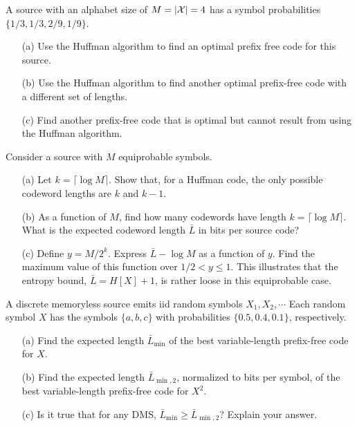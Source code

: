 \documentclass{assignment}
\begin{document}
\begin{prob}[2.12]
    A source with an alphabet size of $M=\left\lvert\mathcal{X}\right\rvert=4$ has a symbol probabilities $\{1/3,1/3,2/9,1/9\}$.
    \begin{itemize}
        \item[(a)] Use the Huffman algorithm to find an optimal prefix free code for this source.
        \item[(b)] Use the Huffman algorithm to find another optimal prefix-free code with a different set of lengths.
        \item[(c)] Find another prefix-free code that is optimal but cannot result from using the Huffman algorithm.
    \end{itemize}
\end{prob}
\begin{sol}
\end{sol}

\begin{prob}[2.14]
    Consider a source with $M$ equiprobable symbols.
    \begin{itemize}
        \item[(a)] Let $k=\lceil\log M\rceil$. Show that, for a Huffman code, the only possible codeword lengths are $k$ and $k-1$.
        \item[(b)] As a function of $M$, find how many codewords have length $k=\lceil\log M\rceil$. What is the expected codeword length $\bar{L}$ in bits per source code?
        \item[(c)] Define $y=M/2^k$. Express $\bar{L}-\log M$ as a function of $y$. Find the maximum value of this function over $1/2<y\leq 1$. This illustrates that the entropy bound, $\bar{L}=H[X]+1$, is rather loose in this equiprobable case.
    \end{itemize}
\end{prob}
\begin{sol}
\end{sol}

\begin{prob}[2.21]
    A discrete memoryless source emits iid random symbols $X_1,X_2,\cdots$ Each random symbol $X$ has the symbols $\{a,b,c\}$ with probabilities $\{0.5,0.4,0.1\}$, respectively.
    \begin{itemize}
        \item[(a)] Find the expected length $\bar{L}_{\min}$ of the best variable-length prefix-free code for $X$.
        \item[(b)] Find the expected length $\bar{L}_{\min,2}$, normalized to bits per symbol, of the best variable-length prefix-free code for $X^2$.
        \item[(c)] Is it true that for any DMS, $\bar{L}_{\min}\geq\bar{L}_{\min,2}$? Explain your answer.
    \end{itemize}
\end{prob}
\begin{sol}
\end{sol}
\end{document}
